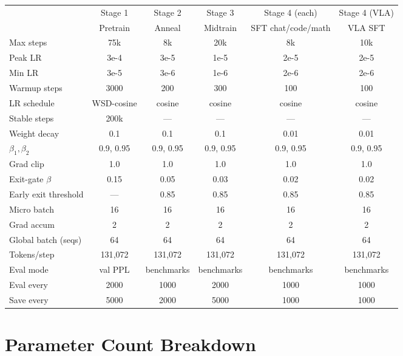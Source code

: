 \documentclass[11pt,a4paper]{article}
\begin{document}
\begin{table}[h]
  \centering
  \footnotesize
  \begin{tabular}{lccccc}
    \toprule
    & Stage 1 & Stage 2 & Stage 3 & Stage 4 (each) & Stage 4 (VLA) \\
    & Pretrain & Anneal & Midtrain & SFT chat/code/math & VLA SFT \\
    \midrule
    Max steps & 75k & 8k & 20k & 8k & 10k \\
    Peak LR & 3e-4 & 3e-5 & 1e-5 & 2e-5 & 2e-5 \\
    Min LR & 3e-5 & 3e-6 & 1e-6 & 2e-6 & 2e-6 \\
    Warmup steps & 3000 & 200 & 300 & 100 & 100 \\
    LR schedule & WSD-cosine & cosine & cosine & cosine & cosine \\
    Stable steps & 200k & --- & --- & --- & --- \\
    Weight decay & 0.1 & 0.1 & 0.1 & 0.01 & 0.01 \\
    $\beta_1, \beta_2$ & 0.9, 0.95 & 0.9, 0.95 & 0.9, 0.95 & 0.9, 0.95 & 0.9, 0.95 \\
    Grad clip & 1.0 & 1.0 & 1.0 & 1.0 & 1.0 \\
    Exit-gate $\beta$ & 0.15 & 0.05 & 0.03 & 0.02 & 0.02 \\
    Early exit threshold & --- & 0.85 & 0.85 & 0.85 & 0.85 \\
    Micro batch & 16 & 16 & 16 & 16 & 16 \\
    Grad accum & 2 & 2 & 2 & 2 & 2 \\
    Global batch (seqs) & 64 & 64 & 64 & 64 & 64 \\
    Tokens/step & 131{,}072 & 131{,}072 & 131{,}072 & 131{,}072 & 131{,}072 \\
    Eval mode & val PPL & benchmarks & benchmarks & benchmarks & benchmarks \\
    Eval every & 2000 & 1000 & 2000 & 1000 & 1000 \\
    Save every & 5000 & 2000 & 5000 & 1000 & 1000 \\
    \bottomrule
  \end{tabular}
\end{table}

\section{Parameter Count Breakdown}
\label{app:params}
\end{document}
